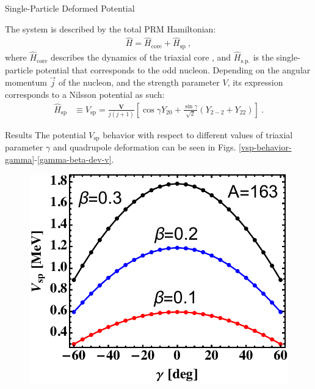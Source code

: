 \documentclass[final]{beamer}
\newlength{\colwidth}
\begin{document}
\begin{frame}[t]
\begin{columns}[t]
\begin{column}{\colwidth}
  \begin{block}{Single-Particle Deformed Potential}

The system is described by the total PRM Hamiltonian:
\begin{align}
    \hat{H}=\hat{H}_\text{core}+\hat{H}_\text{sp}\ ,
\end{align}
where $\hat{H}_\text{core}$ describes the dynamics of the triaxial core \cite{raduta2020new}, and $\hat{H}_\text{s.p.}$ is the single-particle potential that corresponds to the odd nucleon. Depending on the angular momentum $\vec{j}$ of the nucleon, and the strength parameter $V$, its expression corresponds to a Nilsson potential \cite{nilsson1955mat} as such:
\begin{align}
\hat{H}_\text{sp}&\equiv V_\text{sp}=\frac{\mathbf{V}}{j(j+1)}\left[\cos\gamma Y_{20}+\frac{\sin\gamma}{\sqrt{2}}\left(Y_{2-2}+Y_{22}\right)\right]\ .
\end{align}
  \end{block}
    \begin{block}{Results}
  The potential $V_\text{sp}$ behavior with respect to different values of triaxial parameter $\gamma$ and quadrupole deformation can be seen in Figs. \ref{vsp-behavior-gamma}-\ref{gamma-beta-dev-v}.
   \begin{figure}
     \centering
     \begin{minipage}{.5\textwidth}
  \centering
  \includegraphics[scale=1]{images/VSp_gammaBehavior.pdf}
\end{minipage}%
\begin{minipage}{.5\textwidth}

\end{minipage}
\end{figure}
\end{block}
\end{column}
\end{columns}
\end{frame}
\end{document}
